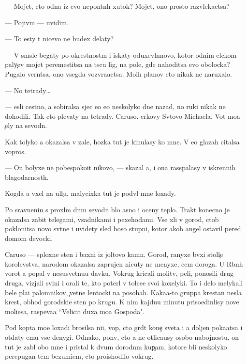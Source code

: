 \documentclass[10pt]{book}
\begin{document}
— Mojet, eto odna iz {\y}evo nepon{\ia}tn{\yi}h xutok? Mojet, ono prosto razvleka{\y}etsa?

— Pojiv{\e}m — uvidim.

— To {\y}esty t{\yi} nicevo ne budex delaty?

— V sm{\yi}sle begaty po okrestnost{\ia}m i iskaty oduxevl{\e}nnovo, kotor{\yi}{\y} odnim {\x}elckom paly{\c}ev mojet peremestitsa na t{\yi}s{\ia}cu lig, na pole, gde nahoditsa {\y}evo obo\-loc\-ka? Pugalo vern{\e}tsa, ono vsegda vozvra{\x}a{\y}etsa. Mo{\y}ih planov eto nikak ne naruxalo.

— No tetrady…

— {\Y}esli cestno, {\y}a sobiralsa sjec {\y}e{\y}o {\y}e{\x}o neskolyko dne{\y} nazad, no ruki nikak ne dohodili. Tak cto plevaty na tetrady. Caruso. {\C}erkovy Sv{\ia}tovo Michaela. Vot mo{\y}a {\c}ely na sevodn{\ia}.

Kak tolyko {\y}a okazalsa v zale, hoz{\ia}{\y}ka tut je kinulasy ko mne. V {\y}e{\y}o glazah citalsa vopros.

— On bolyxe ne pobespoko{\y}it nikovo, — skazal {\y}a, i ona rass{\yi}palasy v iskrennih blagodarnost{\ia}h.

Kogda {\y}a v{\yi}xel na uli{\c}u, malycixka tut je podv{\e}l mne loxady.

Po sravneni{\y}u s proxl{\yi}m dn{\e}m sevodn{\ia} b{\yi}lo {\y}asno i oceny teplo. Trakt konecno je okazalsa zabit telegami, vsadnikami i pexehodami. Vse xli v gorod, ctob{\yi} poklonitsa novo{\y} sv{\ia}t{\yi}ne i uvidety sled boso{\y} stupni, kotor{\yi}{\y} {\y}akob{\yi} angel ostavil pered domom devocki.

Caruso — sploxn{\yi}{\y}e sten{\yi} i baxni iz joltovo kamn{\ia}. Gorod, ranyxe b{\yi}vxi{\y} stoli{\c}e{\y} korolevstva, narodom okazalsa zaprujen nicuty ne menyxe, cem doroga. U R{\yi}bn{\yi}h vorot {\y}a popal v nesusvetnu{\y}u davku. Vokrug kricali molitv{\yi}, peli, ponosili drug druga, vizjali svin{\y}i i orali te, kto poter{\ia}l v tolce{\y}e svo{\y}i koxelyki. To i delo melykali bel{\yi}{\y}e pla{\x}i palomnikov, {\c}vetn{\yi}{\y}e lentocki na posohah. Kaka{\y}a-to gruppa krest{\y}an nesla krest, obhod{\ia} gorodski{\y}e sten{\yi} po krugu. K nim kajdu{\y}u minutu priso{\y}edin{\ia}lisy nov{\yi}{\y}e mol{\ia}{\x}i{\y}esa, raspeva{\y}a ``Velicit duxa mo{\y}a Gospoda".

Pod kop{\yi}ta mo{\y}e{\y} loxadi brosilsa ni{\x}i{\y}, vop{\ia}, cto gr{\ia}d{\e}t kone{\c} sveta i {\y}a doljen poka{\y}atsa i otdaty {\y}emu vse denygi. Odnako, pon{\ia}v, cto {\y}a ne otlica{\y}usy osobo{\y} nabojnost{\y}u, on tut je zab{\yi}l obo mne i pristal k dvum dorodn{\yi}m kup{\c}am, ko\-to\-r{\yi}\-{\y}e b{\yi}li neskolyko perepugan{\yi} tem bezumi{\y}em, cto proishodilo vokrug.
\end{document}
